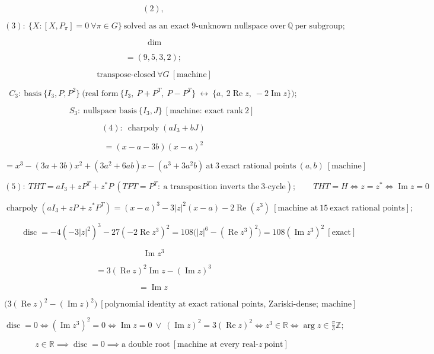 \begin{theorem}
\[
(2),
\]

\[
(3):\ \{X:[X,P_\pi]=0\ \forall\pi\in G\}\ \text{solved as an exact}\ 9\text{-unknown nullspace over}\ \mathbb Q\ \text{per subgroup};
\]

\[
\ \dim
\]

\[
= (9,5,3,2);
\]

\[
\ \text{transpose-closed}\ \forall G\ [\text{machine}]
\]

\[
C_3:\ \text{basis}\ \{I_3,P,P^2\}\ \text{(real form}\ \{I_3,\ P+P^T,\ P-P^T\}\ \leftrightarrow\ \{a,\ 2\operatorname{Re}z,\ -2\operatorname{Im}z\});
\]

\[
\qquad S_3:\ \text{nullspace basis}\ \{I_3,J\}\ [\text{machine: exact rank}\ 2]
\]

\[
(4):\ \operatorname{charpoly}(aI_3+bJ)
\]

\[
= (x-a-3b)(x-a)^2
\]

\[
= x^3-(3a+3b)x^2+(3a^2+6ab)x-(a^3+3a^2b)\ \text{at}\ 3\ \text{exact rational points}\ (a,b)\ [\text{machine}]
\]

\[
(5):\ THT=aI_3+zP^{T}+z^{*}P\ (TPT=P^{T}:\ \text{a transposition inverts the}\ 3\text{-cycle});\qquad THT=H\iff z=z^{*}\iff\operatorname{Im}z=0
\]

\[
\operatorname{charpoly}(aI_3+zP+z^{*}P^{T})=(x-a)^3-3|z|^2(x-a)-2\operatorname{Re}(z^3)\ [\text{machine at}\ 15\ \text{exact rational points}];
\]

\[
\qquad \operatorname{disc}=-4(-3|z|^2)^3-27(-2\operatorname{Re}z^3)^2=108\bigl(|z|^6-(\operatorname{Re}z^3)^2\bigr)=108(\operatorname{Im}z^3)^2\ [\text{exact}]
\]

\[
\operatorname{Im}z^3
\]

\[
= 3(\operatorname{Re}z)^2\operatorname{Im}z-(\operatorname{Im}z)^3
\]

\[
= \operatorname{Im}z\,
\]

\[
\bigl(3(\operatorname{Re}z)^2-(\operatorname{Im}z)^2\bigr)\ [\text{polynomial identity at exact rational points, Zariski-dense};\ \text{machine}]
\]

\[
\operatorname{disc}=0\iff(\operatorname{Im}z^3)^2=0\iff\operatorname{Im}z=0\ \vee\ (\operatorname{Im}z)^2=3(\operatorname{Re}z)^2\iff z^3\in\mathbb R\iff\arg z\in\tfrac\pi3\mathbb Z;
\]

\[
\qquad z\in\mathbb R\implies\operatorname{disc}=0\implies\text{a double root}\ [\text{machine at every real-}z\ \text{point}]
\]


\end{theorem}
